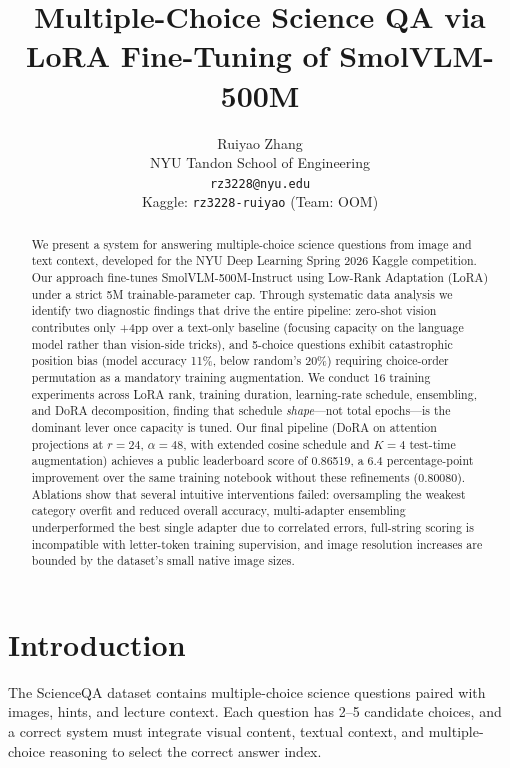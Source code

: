 \documentclass[11pt]{article}
\title{Multiple-Choice Science QA via LoRA Fine-Tuning of SmolVLM-500M}
\author{
  Ruiyao Zhang \\
  NYU Tandon School of Engineering \\
  \texttt{rz3228@nyu.edu} \\
  Kaggle: \texttt{rz3228-ruiyao} (Team: OOM)
}
\begin{document}
\maketitle

\begin{abstract}
We present a system for answering multiple-choice science questions from image and text context, developed for the NYU Deep Learning Spring 2026 Kaggle competition. Our approach fine-tunes SmolVLM-500M-Instruct using Low-Rank Adaptation (LoRA) under a strict 5M trainable-parameter cap. Through systematic data analysis we identify two diagnostic findings that drive the entire pipeline: zero-shot vision contributes only +4pp over a text-only baseline (focusing capacity on the language model rather than vision-side tricks), and 5-choice questions exhibit catastrophic position bias (model accuracy 11\%, below random's 20\%) requiring choice-order permutation as a mandatory training augmentation. We conduct 16 training experiments across LoRA rank, training duration, learning-rate schedule, ensembling, and DoRA decomposition, finding that schedule \emph{shape}---not total epochs---is the dominant lever once capacity is tuned. Our final pipeline (DoRA on attention projections at $r{=}24$, $\alpha{=}48$, with extended cosine schedule and $K{=}4$ test-time augmentation) achieves a public leaderboard score of 0.86519, a 6.4 percentage-point improvement over the same training notebook without these refinements (0.80080). Ablations show that several intuitive interventions failed: oversampling the weakest category overfit and reduced overall accuracy, multi-adapter ensembling underperformed the best single adapter due to correlated errors, full-string scoring is incompatible with letter-token training supervision, and image resolution increases are bounded by the dataset's small native image sizes.
\end{abstract}

\section{Introduction}

The ScienceQA dataset contains multiple-choice science questions paired with images, hints, and lecture context. Each question has 2--5 candidate choices, and a correct system must integrate visual content, textual context, and multiple-choice reasoning to select the correct answer index.
\end{document}
